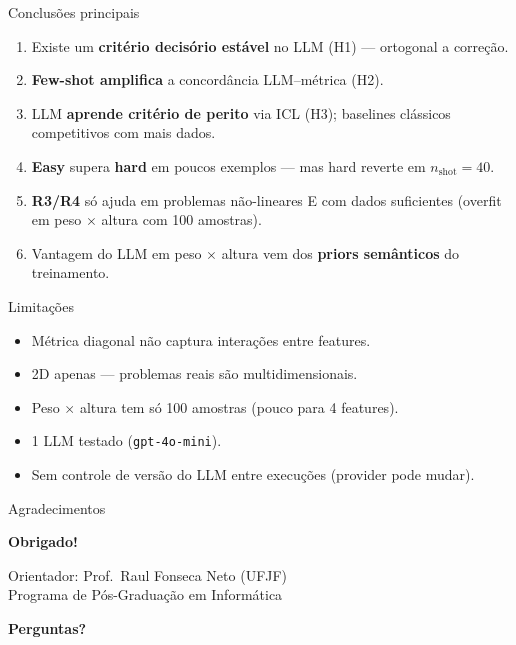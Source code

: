 \documentclass[aspectratio=169,10pt]{beamer}
\begin{document}
\begin{frame}{Conclus\~oes principais}
  \footnotesize
  \begin{enumerate}
    \item Existe um \textbf{crit\'erio decis\'orio est\'avel} no LLM (H1) --- ortogonal a corre\c{c}\~ao.
    \item \textbf{Few-shot amplifica} a concord\^ancia LLM--m\'etrica (H2).
    \item LLM \textbf{aprende crit\'erio de perito} via ICL (H3); baselines cl\'assicos competitivos com mais dados.
    \item \textbf{Easy} supera \textbf{hard} em poucos exemplos --- mas hard reverte em $n_{\text{shot}}=40$.
    \item \textbf{R3/R4} s\'o ajuda em problemas n\~ao-lineares E com dados suficientes (overfit em peso $\times$ altura com 100 amostras).
    \item Vantagem do LLM em peso $\times$ altura vem dos \textbf{priors sem\^anticos} do treinamento.
  \end{enumerate}
\end{frame}

\begin{frame}{Limita\c{c}\~oes}
  \footnotesize
  \begin{itemize}
    \item M\'etrica diagonal n\~ao captura intera\c{c}\~oes entre features.
    \item 2D apenas --- problemas reais s\~ao multidimensionais.
    \item Peso $\times$ altura tem s\'o 100 amostras (pouco para 4 features).
    \item 1 LLM testado (\texttt{gpt-4o-mini}).
    \item Sem controle de vers\~ao do LLM entre execu\c{c}\~oes (provider pode mudar).
  \end{itemize}
\end{frame}

\begin{frame}{Agradecimentos}
  \footnotesize
  \begin{center}
    \Large \textbf{Obrigado!}
    \medskip

    \normalsize
    Orientador: Prof.\ Raul Fonseca Neto (UFJF)\\
    Programa de P\'os-Gradua\c{c}\~ao em Inform\'atica
    \medskip

    \large \textbf{Perguntas?}
  \end{center}
\end{frame}
\end{document}
